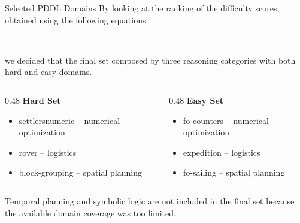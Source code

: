 \documentclass{beamer}
\begin{document}
\begin{frame}{Selected PDDL Domains}\footnotesize
    By looking at the ranking of the difficulty scores, obtained using the following equations:
    \footnotesize

    \vspace{0.2cm}
      \\
    \vspace{0.2cm}
    
    we decided that the final set composed by three reasoning categories with both hard and easy domains.

    \vspace{0.25cm}
    \begin{columns}[T]
        \begin{column}{0.48\textwidth}
            \centering
            \textbf{Hard Set}
            \begin{itemize}
                \item settlersnumeric -- numerical optimization
                \item rover -- logistics
                \item block-grouping -- spatial planning
            \end{itemize}
        \end{column}
        \begin{column}{0.48\textwidth}
            \centering
            \textbf{Easy Set}
            \begin{itemize}
                \item fo-counters -- numerical optimization
                \item expedition -- logistics
                \item fo-sailing -- spatial planning
            \end{itemize}
        \end{column}
    \end{columns}

    \vspace{0.3cm}
    Temporal planning and symbolic logic are not included in the final set because the available domain coverage was too limited.
\end{frame}
\end{document}
